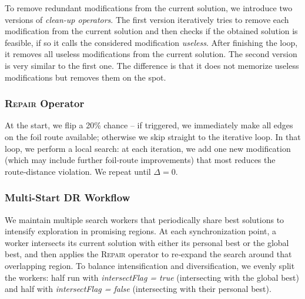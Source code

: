 \documentclass{article}
\begin{document}
To remove redundant modifications from the current solution, we introduce two versions of \textit{clean-up operators}. 
The first version iteratively tries to remove each modification from the current solution and then checks if the obtained solution is feasible, if so it calls the considered modification \textit{useless}. 
After finishing the loop, it removes all useless modifications from the current solution. 
The second version is very similar to the first one. 
The difference is that it does not memorize useless modifications but removes them on the spot.

\subsubsection{\textsc{Repair} Operator}

At the start, we flip a 20\% chance -- if triggered, we immediately make all edges on the foil route available; otherwise we skip straight to the iterative loop.  In that loop, we perform a local search: at each iteration, we add one new modification (which may include further foil‑route improvements) that most reduces the route‑distance violation.  We repeat until $\Delta=0$.

\subsubsection{Multi-Start DR Workflow}

We maintain multiple search workers that periodically share best solutions to intensify exploration in promising regions. At each synchronization point, a worker intersects its current solution with either its personal best or the global best, and then applies the \textsc{Repair} operator to re‑expand the search around that overlapping region. To balance intensification and diversification, we evenly split the workers: half run with \textit{intersectFlag = true} (intersecting with the global best) and half with \textit{intersectFlag = false} (intersecting with their personal best).
\end{document}
